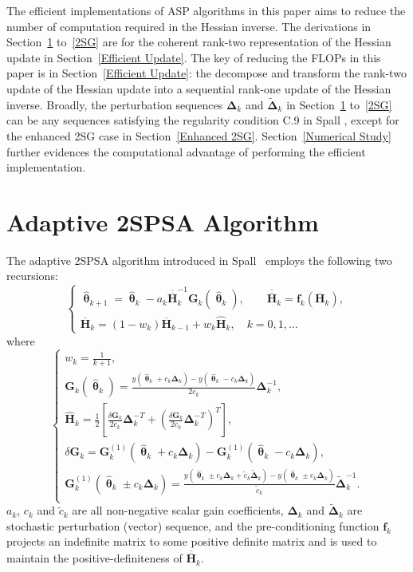 \documentclass[conference,10.3cpt]{IEEEtran}
\newcommand{\bG}{\bm{G}}
\newcommand{\bDelta}{\bm{\Delta}}
\newcommand{\oH}{\bm{\overline{H}}}
\newcommand{\ooH}{\bm{\overline{\overline{H}}}}
\newcommand{\hH}{\bm{\hat{H}}}
\newcommand{\htheta}{\bm{\hat{\uptheta}}}
\newcommand{\tDelta}{\bm{\tilde{\Delta}}}
\begin{document}
The efficient implementations of ASP algorithms in this paper aims to reduce the number of computation required in the Hessian inverse. The derivations in Section~\ref{2SPSA} to~\ref{2SG} are for the coherent rank-two representation of the Hessian update in Section~\ref{Efficient Update}. The key of reducing the FLOPs in this paper is in Section~\ref{Efficient Update}: the decompose and transform the rank-two update of the Hessian update into a sequential rank-one update of the Hessian inverse. Broadly, the perturbation sequences $\bDelta_k$ and
$\tDelta_k$ in Section~\ref{2SPSA} to~\ref{2SG} can be any sequences
satisfying the regularity condition C.9 in Spall
\cite{Spall2009}, except for the enhanced 2SG case in Section~\ref{Enhanced 2SG}. Section~\ref{Numerical Study} further evidences the computational advantage of performing the efficient implementation. 

\section{Adaptive 2SPSA Algorithm}  \label{2SPSA}
The adaptive 2SPSA algorithm introduced in Spall~\cite{Spall2000} employs the following
two recursions:
\begin{equation} \label{eq:Adaptation}
  \begin{cases}
    \htheta_{k+1}=\htheta_k-a_k\ooH_k^{-1} \bG_k(\htheta_k),
  \qquad \bm{\ooH}_k=\bm{f}_k(\oH_k),\\ \oH_k= (1 - w_k) \oH_{k-1}+ w_k \hH_k,
 \quad k=0,1,\dots
  \end{cases}
\end{equation}
where
\begin{equation} \label{eq:notations}
  \begin{cases} w_k=\frac{1}{k+1},\\
    \bG_k(\htheta_k)=\frac{y(\htheta_k+c_k\bDelta_k)-y(\htheta_k-c_k\bDelta_k)}{2c_k}\bDelta_k^{-1},\\
    \hH_k=\frac{1}{2}\left[
      \frac{\delta\bG_k}{2c_k}\bDelta_k^{-T}+\left(\frac{\delta\bG_k}{2c_k}\bDelta_k^{-T}\right)^T \right],\\
    \delta\bG_k=\bG_k^{(1)}(\htheta_k+ c_k\bDelta_k)-\bG_k^{(1)}(\htheta_k- c_k\bDelta_k),\\
    \bG_k^{(1)}(\htheta_k\pm c_k\bDelta_k) =\frac{y(\htheta_k\pm c_k\bDelta_k+\tilde{c}_k\tDelta_k)-y(\htheta_k\pm c_k\bDelta_k)}{\tilde{c}_k}\tDelta_k^{-1}.\\
  \end{cases}
\end{equation} $ a_k $, $ c_k $ and $ \tilde{c}_k $ are all
non-negative scalar gain coefficients, $ \bDelta_k $ and $ \tDelta_k $
are stochastic perturbation (vector) sequence, and the
pre-conditioning function $ \bm{f}_k $ projects an indefinite matrix
to some positive definite matrix and is used to maintain the
positive-definiteness of $\ooH_k$.
\end{document}
